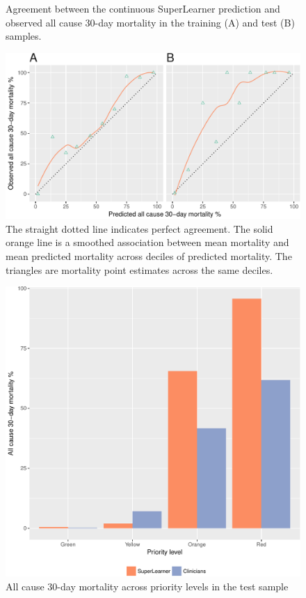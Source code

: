 \documentclass[10pt,letterpaper]{article}\usepackage[]{graphicx}\usepackage[]{color}
\begin{document}
\begin{figure}
  \caption{Agreement between the continuous SuperLearner prediction and observed
    all cause 30-day mortality in the training (A) and test (B) samples.}
  \label{fig:calibration_plot}
  \includegraphics[width=\textwidth]{calibration_plot.pdf}
  \caption*{The straight dotted line indicates perfect agreement. The solid
    orange line is a smoothed association between mean mortality and mean
    predicted mortality across deciles of predicted mortality. The triangles are
    mortality point estimates across the same deciles.}
\end{figure}

\begin{figure}
  \caption{All cause 30-day mortality across priority levels in the test sample}
  \label{fig:mortality_plot}
  \includegraphics[width=\textwidth]{mortality_plot.pdf}
\end{figure}
\end{document}
